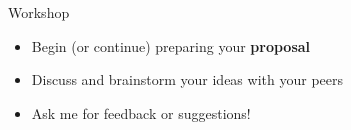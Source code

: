 
%
%



\begin{frame}{Workshop}
        \begin{itemize}
                \item Begin (or continue) preparing your \textbf{proposal}
                \item Discuss and brainstorm your ideas with your peers
                \item Ask me for feedback or suggestions!
        \end{itemize}
\end{frame}


